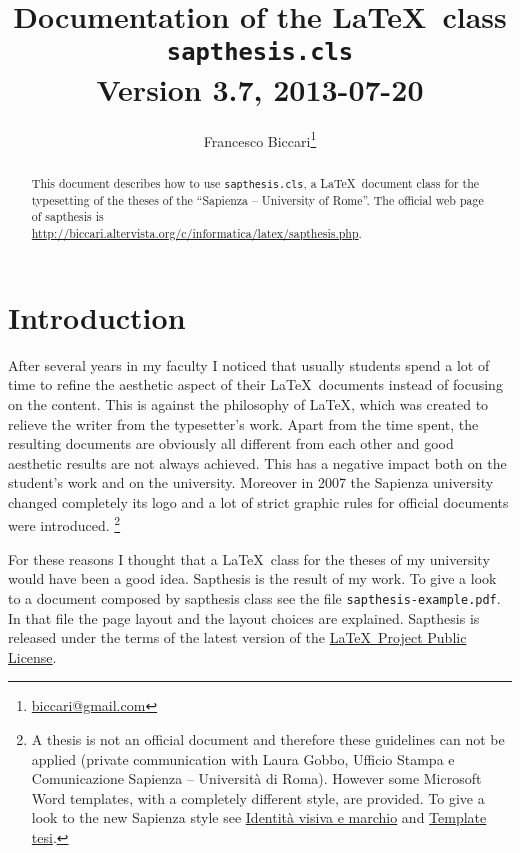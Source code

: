 \documentclass[a5paper,11pt]{article}
\author{\small Francesco Biccari\thanks{\href{mailto:biccari@gmail.com}{biccari@gmail.com}}}
\title{\small Documentation of the \LaTeX\ class\\
		\Large \textbf{\texttt{sapthesis.cls}}\\
		\small \vspace{0.2cm} Version 3.7, 2013-07-20
}
\date{}
\begin{document}
\maketitle

\begin{abstract}\noindent
This document describes how to use \texttt{sapthesis.cls}, a \LaTeX\ document class for the typesetting of the theses of the ``Sapienza -- University of Rome''. The official web page of \textsf{sapthesis} is\\
{\footnotesize\url{http://biccari.altervista.org/c/informatica/latex/sapthesis.php}}.
\end{abstract}

\setcounter{tocdepth}{2}
\renewcommand{\columnseprule}{0.4pt}
\setlength{\columnsep}{1.5cm}

{\small
\tableofcontents}

\clearpage

\section{Introduction}

After several years in my faculty I noticed that usually students spend a lot of time to refine the aesthetic aspect of their \LaTeX\ documents instead of focusing on the content.
This is against the philosophy of \LaTeX, which was created to relieve the writer from the typesetter's work.
Apart from the time spent, the resulting documents are obviously all different from each other and good aesthetic results are not always achieved.
This has a negative impact both on the student's work and on the university.
Moreover in 2007 the Sapienza university changed completely its
logo and a lot of strict graphic rules for official documents were introduced.%
\footnote{A thesis is not an official document and therefore these guidelines can not be applied (private communication with Laura Gobbo, Ufficio Stampa e Comunicazione Sapienza -- Universit\`a di Roma).
However some Microsoft Word templates, with a completely different style, are provided.
To give a look to the new Sapienza style see 
\href{http://www.uniroma1.it/ateneo/chi-siamo/identit\%C3\%A0-visiva-e-marchio}{Identit\`a visiva e marchio} and \href{http://www.uniroma1.it/logotesi}{Template tesi}.}

For these reasons I thought that a \LaTeX\ class for the theses of my 
university would have been a good idea.
\textsf{Sapthesis} is the result of my work.
To give a look to a document composed by \textsf{sapthesis} class see the file
\texttt{sapthesis-example.pdf}.
In that file the page layout and the layout choices are explained.
\textsf{Sapthesis} is released under the terms of the latest version of the 
\href{http://www.latex-project.org/lppl/}{\LaTeX\ Project Public License}.
\end{document}
